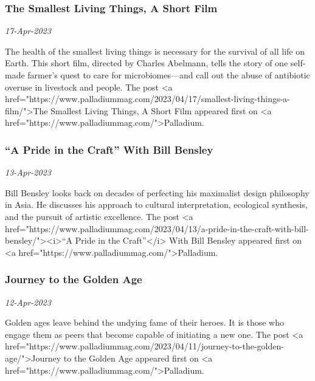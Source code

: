 \subsubsection{The Smallest Living Things, A Short Film \href{https://www.palladiummag.com/2023/04/17/smallest-living-things-a-film/}{}}
\textit{17-Apr-2023}

The health of the smallest living things is necessary for the survival of all life on Earth. This short film, directed by Charles Abelmann, tells the story of one self-made farmer’s quest to care for microbiomes—and call out the abuse of antibiotic overuse in livestock and people.
The post <a href="https://www.palladiummag.com/2023/04/17/smallest-living-things-a-film/">The Smallest Living Things, A Short Film
 appeared first on <a href="https://www.palladiummag.com/">Palladium.
\subsubsection{“A Pride in the Craft” With Bill Bensley \href{https://www.palladiummag.com/2023/04/13/a-pride-in-the-craft-with-bill-bensley/}{}}
\textit{13-Apr-2023}

Bill Bensley looks back on decades of perfecting his maximalist design philosophy in Asia. He discusses his approach to cultural interpretation, ecological synthesis, and the pursuit of artistic excellence.
The post <a href="https://www.palladiummag.com/2023/04/13/a-pride-in-the-craft-with-bill-bensley/"><i>“A Pride in the Craft”</i> With Bill Bensley
 appeared first on <a href="https://www.palladiummag.com/">Palladium.
\subsubsection{Journey to the Golden Age \href{https://www.palladiummag.com/2023/04/11/journey-to-the-golden-age/}{}}
\textit{12-Apr-2023}

Golden ages leave behind the undying fame of their heroes. It is those who engage them as peers that become capable of initiating a new one.
The post <a href="https://www.palladiummag.com/2023/04/11/journey-to-the-golden-age/">Journey to the Golden Age
 appeared first on <a href="https://www.palladiummag.com/">Palladium.
